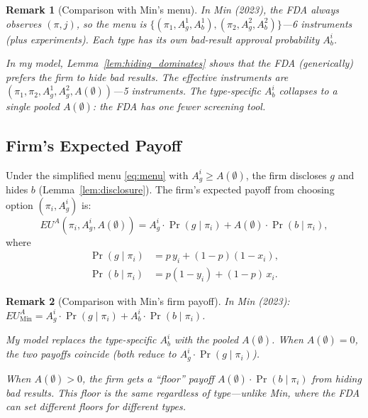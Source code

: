 \documentclass[12pt,a4paper]{article}
\newtheorem{remark}{Remark}
\begin{document}
\begin{remark}[Comparison with Min's menu]
\label{rem:menu_comparison}
In Min (2023), the FDA always observes $(\pi, j)$, so the menu
is $\{(\pi_1, A_g^1, A_b^1), (\pi_2, A_g^2, A_b^2)\}$---6
instruments (plus experiments). Each type has its own
bad-result approval probability $A_b^i$.

In my model, Lemma~\ref{lem:hiding_dominates} shows that the
FDA (generically) prefers the firm to hide bad results. The
effective instruments are $(\pi_1, \pi_2, A_g^1, A_g^2,
A(\emptyset))$---5 instruments. The type-specific $A_b^i$
collapses to a single pooled $A(\emptyset)$: the FDA has one
fewer screening tool.
\end{remark}


\subsection{Firm's Expected Payoff}
\label{sec:firm_payoff}

Under the simplified menu \eqref{eq:menu} with
$A_g^i \geq A(\emptyset)$, the firm discloses $g$ and hides
$b$ (Lemma~\ref{lem:disclosure}). The firm's expected payoff
from choosing option $(\pi_i, A_g^i)$ is:
\begin{equation}\label{eq:EU_A}
  EU^A(\pi_i, A_g^i, A(\emptyset))
  = A_g^i \cdot \Pr(g \mid \pi_i)
    + A(\emptyset) \cdot \Pr(b \mid \pi_i),
\end{equation}
where
\begin{align}
  \Pr(g \mid \pi_i) &= p \, y_i + (1-p)(1-x_i),
    \label{eq:prob_g} \\
  \Pr(b \mid \pi_i) &= p(1-y_i) + (1-p) \, x_i.
    \label{eq:prob_b}
\end{align}

\begin{remark}[Comparison with Min's firm payoff]
In Min (2023):
$EU^A_{\text{Min}} = A_g^i \cdot \Pr(g \mid \pi_i)
  + A_b^i \cdot \Pr(b \mid \pi_i)$.

My model replaces the type-specific $A_b^i$ with the
pooled $A(\emptyset)$. When $A(\emptyset) = 0$, the two
payoffs coincide (both reduce to
$A_g^i \cdot \Pr(g \mid \pi_i)$).

When $A(\emptyset) > 0$, the firm gets a ``floor'' payoff
$A(\emptyset) \cdot \Pr(b \mid \pi_i)$ from hiding bad
results. This floor is the same regardless of type---unlike
Min, where the FDA can set different floors for different
types.
\end{remark}
\end{document}

